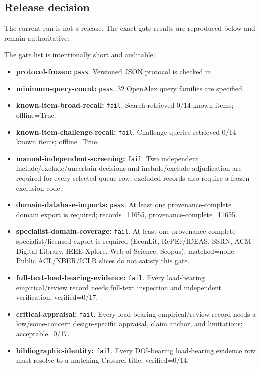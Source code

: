 \documentclass[11pt]{article}
\providecommand{\tightlist}{\setlength{\itemsep}{0pt}\setlength{\parskip}{0pt}}
\begin{document}
\hypertarget{release-decision}{%
\subsection{Release decision}\label{release-decision}}

The current run is not a release. The exact gate results are reproduced below and remain authoritative:

The gate list is intentionally short and auditable:

\begin{itemize}
\tightlist
\item
  \textbf{protocol-frozen:} \texttt{pass}. Versioned JSON protocol is checked in.
\item
  \textbf{minimum-query-count:} \texttt{pass}. 32 OpenAlex query families are specified.
\item
  \textbf{known-item-broad-recall:} \texttt{fail}. Search retrieved 0/14 known items; offline=True.
\item
  \textbf{known-item-challenge-recall:} \texttt{fail}. Challenge queries retrieved 0/14 known items; offline=True.
\item
  \textbf{manual-independent-screening:} \texttt{fail}. Two independent include/exclude/uncertain decisions and include/exclude adjudication are required for every selected queue row; excluded records also require a frozen exclusion code.
\item
  \textbf{domain-database-imports:} \texttt{pass}. At least one provenance-complete domain export is required; records=11655, provenance-complete=11655.
\item
  \textbf{specialist-domain-coverage:} \texttt{fail}. At least one provenance-complete specialist/licensed export is required (EconLit, RePEc/IDEAS, SSRN, ACM Digital Library, IEEE Xplore, Web of Science, Scopus); matched=none. Public ACL/NBER/ICLR slices do not satisfy this gate.
\item
  \textbf{full-text-load-bearing-evidence:} \texttt{fail}. Every load-bearing empirical/review record needs full-text inspection and independent verification; verified=0/17.
\item
  \textbf{critical-appraisal:} \texttt{fail}. Every load-bearing empirical/review record needs a low/some-concern design-specific appraisal, claim anchor, and limitations; acceptable=0/17.
\item
  \textbf{bibliographic-identity:} \texttt{fail}. Every DOI-bearing load-bearing evidence row must resolve to a matching Crossref title; verified=0/14.

\end{itemize}
\end{document}
